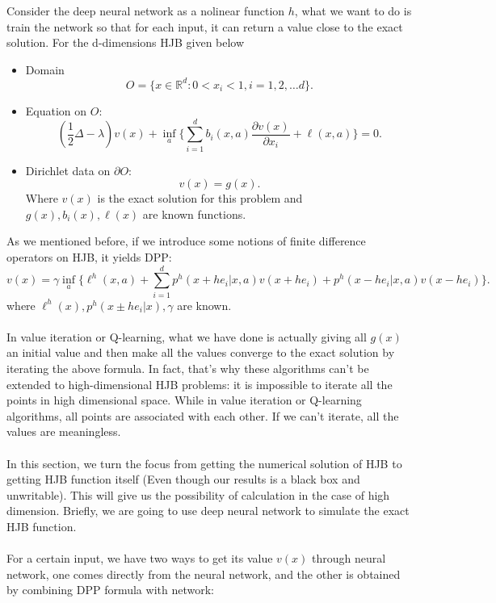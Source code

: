 \documentclass[11pt]{amsart}
\begin{document}
Consider the deep neural network as a nolinear function $h$, what we want to do is train the network so that for each input, it can return a value close to the exact solution.  For the d-dimensions HJB given below
\begin{itemize}
 \item Domain 
 $$O = \{x\in \mathbb R^{d}: 0<x_{i}< 1, i =1,2, \ldots d\}.$$
 \item Equation on $O$: 
 $$(\frac 1 2 \Delta -  \lambda) v(x) + \inf_a \Big\{
 \sum_{i=1}^db_i(x,a)  \frac{\partial v(x)}{\partial x_i}  
  + \ell(x,a)
 \Big\} = 0.$$
 \item Dirichlet data on $\partial O$:
 $$v(x) = g(x).$$
Where $v(x)$ is the exact solution for this problem and $g(x),b_i(x) , \ell(x)$ are known functions.
\end{itemize}
As we mentioned before, if we introduce some notions of finite difference operators on HJB, it yields DPP:
$$
v (x) = \gamma \inf_{a} 
\Big\{ \ell^{h}(x, a) + 
\sum_{i=1}^{d} 
p^{h}(x+he_{i}|x, a) v(x+he_{i})
+ p^{h}(x-he_{i}|x, a) v(x-he_{i})
\Big\}.
$$
where $\ell^{h}(x),p^{h}(x \pm he_{i}|x),\gamma $ are known.
\\ \hspace*{\fill} \\
In value iteration or Q-learning, what we have done is actually giving all $g(x)$ an initial value and then make all the values converge to the exact solution by iterating the above formula. In fact, that's why these algorithms can't be extended to high-dimensional HJB problems: it is impossible to iterate all the points in high dimensional space. While in value iteration or Q-learning algorithms, all points are associated with each other. If we can't iterate, all the values are meaningless. 
\\ \hspace*{\fill} \\
In this section, we turn the focus from getting the numerical solution of HJB to getting HJB function itself (Even though our results is a black box and unwritable). This will give us the possibility of calculation in the case of high dimension. Briefly, we are going to use deep neural network to simulate the exact HJB function. 
\\ \hspace*{\fill} \\
For a certain input, we have two ways to get its value $v(x)$ through neural network, one comes directly from the neural network, and the other is obtained by combining DPP formula with network:
\end{document}
